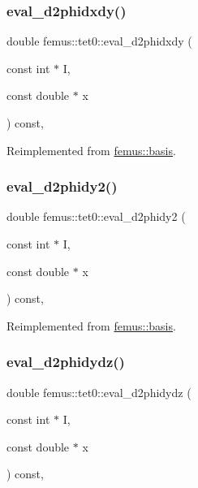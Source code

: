 \subsubsection{\texorpdfstring{eval\+\_\+d2phidxdy()}{eval\_d2phidxdy()}}
{\footnotesize\ttfamily double femus\+::tet0\+::eval\+\_\+d2phidxdy (\begin{DoxyParamCaption}\item[{const int $\ast$}]{I,  }\item[{const double $\ast$}]{x }\end{DoxyParamCaption}) const\hspace{0.3cm}{\ttfamily [inline]}, {\ttfamily [virtual]}}



Reimplemented from \mbox{\hyperlink{classfemus_1_1basis_ac9feaf9e60421143db2a3708f3c7fa48}{femus\+::basis}}.

\mbox{\label{classfemus_1_1tet0_afc37f82556b5b073967bc48c7317e02f}} 
\subsubsection{\texorpdfstring{eval\+\_\+d2phidy2()}{eval\_d2phidy2()}}
{\footnotesize\ttfamily double femus\+::tet0\+::eval\+\_\+d2phidy2 (\begin{DoxyParamCaption}\item[{const int $\ast$}]{I,  }\item[{const double $\ast$}]{x }\end{DoxyParamCaption}) const\hspace{0.3cm}{\ttfamily [inline]}, {\ttfamily [virtual]}}



Reimplemented from \mbox{\hyperlink{classfemus_1_1basis_a0febb29fe4b32213ff8d6d428f7241cd}{femus\+::basis}}.

\mbox{\label{classfemus_1_1tet0_af44ea8094a0f62c9bc345df68798359c}} 
\subsubsection{\texorpdfstring{eval\+\_\+d2phidydz()}{eval\_d2phidydz()}}
{\footnotesize\ttfamily double femus\+::tet0\+::eval\+\_\+d2phidydz (\begin{DoxyParamCaption}\item[{const int $\ast$}]{I,  }\item[{const double $\ast$}]{x }\end{DoxyParamCaption}) const\hspace{0.3cm}{\ttfamily [inline]}, {\ttfamily [virtual]}}



